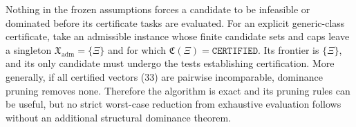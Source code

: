 Nothing in the frozen assumptions forces a candidate to be infeasible or dominated before its certificate tasks are evaluated.  For an explicit generic-class certificate, take an admissible instance whose finite candidate sets and caps leave a singleton \(\mathfrak X_{\mathrm{adm}}=\{\Xi\}\) and for which \(\mathfrak C(\Xi)=\mathtt{CERTIFIED}\).  Its frontier is \(\{\Xi\}\), and its only candidate must undergo the tests establishing certification.  More generally, if all certified vectors (33) are pairwise incomparable, dominance pruning removes none.  Therefore the algorithm is exact and its pruning rules can be useful, but no strict worst-case reduction from exhaustive evaluation follows without an additional structural dominance theorem.
